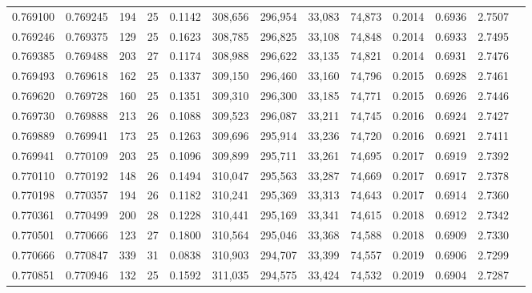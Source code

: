 \begin{tabular}{rrrrrrrrrrrrr}
0.769100 & 0.769245 &   194 &  25 &                                     0.1142 & 308,656 & 296,954 &  33,083 &  74,873 & 0.2014 & 0.6936 & 2.7507 \\
0.769246 & 0.769375 &   129 &  25 &                                     0.1623 & 308,785 & 296,825 &  33,108 &  74,848 & 0.2014 & 0.6933 & 2.7495 \\
0.769385 & 0.769488 &   203 &  27 &                                     0.1174 & 308,988 & 296,622 &  33,135 &  74,821 & 0.2014 & 0.6931 & 2.7476 \\
0.769493 & 0.769618 &   162 &  25 &                                     0.1337 & 309,150 & 296,460 &  33,160 &  74,796 & 0.2015 & 0.6928 & 2.7461 \\
0.769620 & 0.769728 &   160 &  25 &                                     0.1351 & 309,310 & 296,300 &  33,185 &  74,771 & 0.2015 & 0.6926 & 2.7446 \\
0.769730 & 0.769888 &   213 &  26 &                                     0.1088 & 309,523 & 296,087 &  33,211 &  74,745 & 0.2016 & 0.6924 & 2.7427 \\
0.769889 & 0.769941 &   173 &  25 &                                     0.1263 & 309,696 & 295,914 &  33,236 &  74,720 & 0.2016 & 0.6921 & 2.7411 \\
0.769941 & 0.770109 &   203 &  25 &                                     0.1096 & 309,899 & 295,711 &  33,261 &  74,695 & 0.2017 & 0.6919 & 2.7392 \\
0.770110 & 0.770192 &   148 &  26 &                                     0.1494 & 310,047 & 295,563 &  33,287 &  74,669 & 0.2017 & 0.6917 & 2.7378 \\
0.770198 & 0.770357 &   194 &  26 &                                     0.1182 & 310,241 & 295,369 &  33,313 &  74,643 & 0.2017 & 0.6914 & 2.7360 \\
0.770361 & 0.770499 &   200 &  28 &                                     0.1228 & 310,441 & 295,169 &  33,341 &  74,615 & 0.2018 & 0.6912 & 2.7342 \\
0.770501 & 0.770666 &   123 &  27 &                                     0.1800 & 310,564 & 295,046 &  33,368 &  74,588 & 0.2018 & 0.6909 & 2.7330 \\
0.770666 & 0.770847 &   339 &  31 &                                     0.0838 & 310,903 & 294,707 &  33,399 &  74,557 & 0.2019 & 0.6906 & 2.7299 \\
0.770851 & 0.770946 &   132 &  25 &                                     0.1592 & 311,035 & 294,575 &  33,424 &  74,532 & 0.2019 & 0.6904 & 2.7287 \\

\end{tabular}
